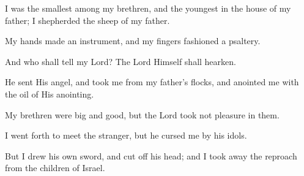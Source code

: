I was the smallest among my brethren, and the youngest in the house of my father; I shepherded the sheep of my father.

My hands made an instrument, and my fingers fashioned a psaltery.

And who shall tell my Lord? The Lord Himself shall hearken.

He sent His angel, and took me from my father’s flocks, and anointed me with the oil of His anointing.

My brethren were big and good, but the Lord took not pleasure in them.

I went forth to meet the stranger, but he cursed me by his idols.

But I drew his own sword, and cut off his head; and I took away the reproach from the children of Israel.
